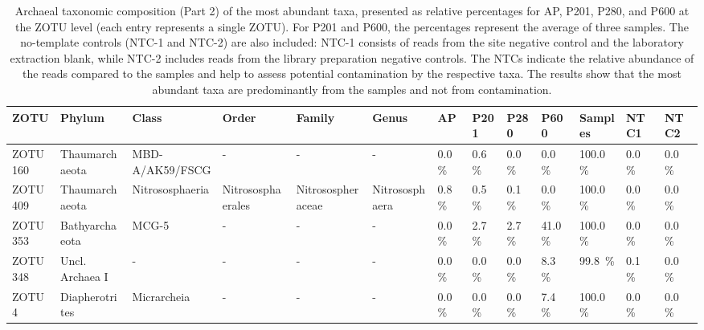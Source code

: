\begin{table}  %
\centering
\begin{adjustbox}{max width=0.8\textwidth, max totalheight=0.85\textheight, keepaspectratio}
\renewcommand{\arraystretch}{1.5} %
\footnotesize %
\caption{Archaeal taxonomic composition (Part 2) of the most abundant taxa, presented as relative percentages for AP, P201, P280, and P600 at the ZOTU level (each entry represents a single ZOTU).
For P201 and P600, the percentages represent the average of three samples.
The no-template controls (NTC-1 and NTC-2) are also included: NTC-1 consists of reads from the site negative control and the laboratory extraction blank, while NTC-2 includes reads from the library preparation negative controls.
The NTCs indicate the relative abundance of the reads compared to the samples and help to assess potential contamination by the respective taxa.
The results show that the most abundant taxa are predominantly from the samples and not from contamination.}
\label{tabSI:tax_arc_2}
\begin{tabular}{llllllllll||lll}
\toprule
\textbf{ZOTU} & \textbf{Phylum} & \textbf{Class} & \textbf{Order} & \textbf{Family} & \textbf{Genus} & \textbf{AP} & \textbf{P201} & \textbf{P280} & \textbf{P600} & \textbf{Samples} & \textbf{NTC1} & \textbf{NTC2} \\
\midrule
ZOTU160 & Thaumarchaeota & MBD-A/AK59/FSCG & - & - & - & \SI{0.0}{\percent} & \SI{0.6}{\percent} & \SI{0.0}{\percent} & \SI{0.0}{\percent} & \SI{100.0}{\percent} & \SI{0.0}{\percent} & \SI{0.0}{\percent} \\
ZOTU409 & Thaumarchaeota & Nitrososphaeria & Nitrososphaerales & Nitrosospheraceae & Nitrososphaera & \SI{0.8}{\percent} & \SI{0.5}{\percent} & \SI{0.1}{\percent} & \SI{0.0}{\percent} & \SI{100.0}{\percent} & \SI{0.0}{\percent} & \SI{0.0}{\percent} \\
ZOTU353 & Bathyarchaeota & MCG-5 & - & - & - & \SI{0.0}{\percent} & \SI{2.7}{\percent} & \SI{2.7}{\percent} & \SI{41.0}{\percent} & \SI{100.0}{\percent} & \SI{0.0}{\percent} & \SI{0.0}{\percent} \\
ZOTU348 & Uncl. Archaea I & - & - & - & - & \SI{0.0}{\percent} & \SI{0.0}{\percent} & \SI{0.0}{\percent} & \SI{8.3}{\percent} & \SI{99.8}{\percent} & \SI{0.1}{\percent} & \SI{0.0}{\percent} \\
ZOTU4 & Diapherotrites & Micrarcheia & - & - & - & \SI{0.0}{\percent} & \SI{0.0}{\percent} & \SI{0.0}{\percent} & \SI{7.4}{\percent} & \SI{100.0}{\percent} & \SI{0.0}{\percent} & \SI{0.0}{\percent} \\

\end{tabular}
\end{adjustbox}
\end{table}
